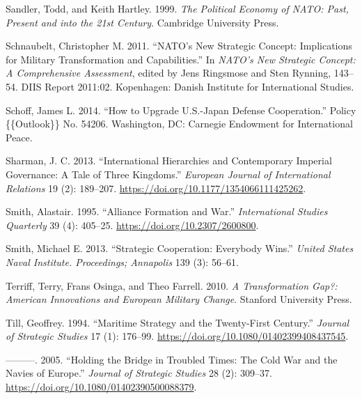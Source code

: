 \documentclass[
  12,
  letterpaper,
  DIV=11,
  numbers=noendperiod]{scrartcl}
\newlength{\cslhangindent}
\newlength{\cslentryspacingunit} %
\newenvironment{CSLReferences}[2] %
 {%
  \setlength{\parindent}{0pt}
  \ifodd #1
  \let\oldpar\par
  \def\par{\hangindent=\cslhangindent\oldpar}
  \fi
  \setlength{\parskip}{#2\cslentryspacingunit}
 }%
 {}
\begin{document}
\begin{CSLReferences}{1}{0}
\leavevmode{}%
Sandler, Todd, and Keith Hartley. 1999. \emph{The {Political Economy} of
{NATO}: {Past}, {Present} and into the 21st {Century}}. {Cambridge
University Press}.

\leavevmode{}%
Schnaubelt, Christopher M. 2011. {``{NATO}'s {New Strategic Concept}:
{Implications} for {Military} {Transformation} and {Capabilities}.''} In
\emph{{NATO}'s New Strategic Concept: A Comprehensive Assessment},
edited by Jens Ringsmose and Sten Rynning, 143--54. {DIIS} Report
2011:02. {Kopenhagen}: {Danish Institute for International Studies}.

\leavevmode{}%
Schoff, James L. 2014. {``How to {Upgrade U}.{S}.-{Japan Defense
Cooperation}.''} Policy \{\{Outlook\}\} No. 54206. {Washington, DC}:
{Carnegie Endowment for International Peace}.

\leavevmode{}%
Sharman, J. C. 2013. {``International Hierarchies and Contemporary
Imperial Governance: {A} Tale of Three Kingdoms.''} \emph{European
Journal of International Relations} 19 (2): 189--207.
\url{https://doi.org/10.1177/1354066111425262}.

\leavevmode{}%
Smith, Alastair. 1995. {``Alliance {Formation} and {War}.''}
\emph{International Studies Quarterly} 39 (4): 405--25.
\url{https://doi.org/10.2307/2600800}.

\leavevmode{}%
Smith, Michael E. 2013. {``Strategic {Cooperation}: {Everybody Wins}.''}
\emph{United States Naval Institute. Proceedings; Annapolis} 139 (3):
56--61.

\leavevmode{}%
Terriff, Terry, Frans Osinga, and Theo Farrell. 2010. \emph{A
{Transformation Gap}?: {American Innovations} and {European Military
Change}}. {Stanford University Press}.

\leavevmode{}%
Till, Geoffrey. 1994. {``Maritime Strategy and the Twenty-First
Century.''} \emph{Journal of Strategic Studies} 17 (1): 176--99.
\url{https://doi.org/10.1080/01402399408437545}.

\leavevmode{}%
---------. 2005. {``Holding the {Bridge} in {Troubled Times}: {The Cold
War} and the {Navies} of {Europe}.''} \emph{Journal of Strategic
Studies} 28 (2): 309--37.
\url{https://doi.org/10.1080/01402390500088379}.


\end{CSLReferences}
\end{document}
